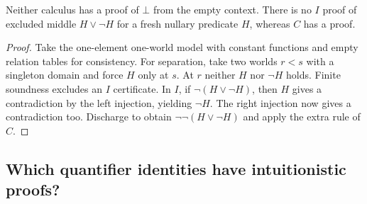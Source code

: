 \begin{corollary}\label{cor:ded-cons}
Neither calculus has a proof of $\bot$ from the empty context.
There is no $I$ proof of excluded middle $H\vee\neg H$ for a fresh
nullary predicate $H$, whereas $C$ has a proof.
\end{corollary}
\begin{proof}
Take the one-element one-world model with constant functions and empty
relation tables for consistency. For separation, take two worlds $r<s$
with a singleton domain and force $H$ only at $s$. At $r$ neither $H$
nor $\neg H$ holds. Finite soundness excludes an $I$ certificate.
In $I$, if $\neg(H\vee\neg H)$, then $H$ gives a contradiction by the
left injection, yielding $\neg H$. The right injection now gives a
contradiction too. Discharge to obtain $\neg\neg(H\vee\neg H)$ and
apply the extra rule of $C$.
\end{proof}

\subsection{Which quantifier identities have intuitionistic proofs?}

